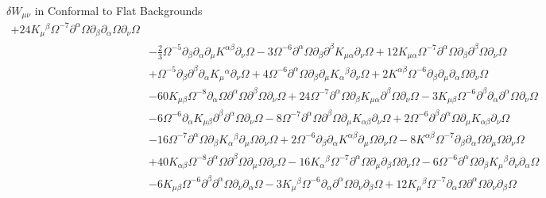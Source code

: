 \documentclass[8pt,aspectratio=1610]{beamer}
\begin{document}
\begin{frame}{$\delta W_{\mu\nu}$ in Conformal to Flat Backgrounds}
{\begin{align}
		+ 24 K_{\mu}{}^{\beta} \Omega^{-7} \partial^{\alpha}\Omega \partial_{\beta}\partial_{\alpha}\Omega \partial_{\nu}\Omega 
		\nonumber\\
		&-  \tfrac{2}{3} \Omega^{-5} \partial_{\beta}\partial_{\alpha}\partial_{\mu}K^{\alpha \beta} \partial_{\nu}\Omega - 3 \Omega^{-6} \partial^{\alpha}\Omega \partial_{\beta}\partial^{\beta}K_{\mu \alpha} \partial_{\nu}\Omega + 12 K_{\mu \alpha} \Omega^{-7} \partial^{\alpha}\Omega \partial_{\beta}\partial^{\beta}\Omega \partial_{\nu}\Omega 
		\nonumber\\
		&+ \Omega^{-5} \partial_{\beta}\partial^{\beta}\partial_{\alpha}K_{\mu}{}^{\alpha} \partial_{\nu}\Omega + 4 \Omega^{-6} \partial^{\alpha}\Omega \partial_{\beta}\partial_{\mu}K_{\alpha}{}^{\beta} \partial_{\nu}\Omega + 2 K^{\alpha \beta} \Omega^{-6} \partial_{\beta}\partial_{\mu}\partial_{\alpha}\Omega \partial_{\nu}\Omega 
		\nonumber\\
		&- 60 K_{\mu \beta} \Omega^{-8} \partial_{\alpha}\Omega \partial^{\alpha}\Omega \partial^{\beta}\Omega \partial_{\nu}\Omega + 24 \Omega^{-7} \partial^{\alpha}\Omega \partial_{\beta}K_{\mu \alpha} \partial^{\beta}\Omega \partial_{\nu}\Omega - 3 K_{\mu \beta} \Omega^{-6} \partial^{\beta}\partial_{\alpha}\partial^{\alpha}\Omega \partial_{\nu}\Omega 
		\nonumber\\
		&- 6 \Omega^{-6} \partial_{\alpha}K_{\mu \beta} \partial^{\beta}\partial^{\alpha}\Omega \partial_{\nu}\Omega - 8 \Omega^{-7} \partial^{\alpha}\Omega \partial^{\beta}\Omega \partial_{\mu}K_{\alpha \beta} \partial_{\nu}\Omega + 2 \Omega^{-6} \partial^{\beta}\partial^{\alpha}\Omega \partial_{\mu}K_{\alpha \beta} \partial_{\nu}\Omega 
		\nonumber\\
		&- 16 \Omega^{-7} \partial^{\alpha}\Omega \partial_{\beta}K_{\alpha}{}^{\beta} \partial_{\mu}\Omega \partial_{\nu}\Omega + 2 \Omega^{-6} \partial_{\beta}\partial_{\alpha}K^{\alpha \beta} \partial_{\mu}\Omega \partial_{\nu}\Omega - 8 K^{\alpha \beta} \Omega^{-7} \partial_{\beta}\partial_{\alpha}\Omega \partial_{\mu}\Omega \partial_{\nu}\Omega 
		\nonumber\\
		&+ 40 K_{\alpha \beta} \Omega^{-8} \partial^{\alpha}\Omega \partial^{\beta}\Omega \partial_{\mu}\Omega \partial_{\nu}\Omega - 16 K_{\alpha}{}^{\beta} \Omega^{-7} \partial^{\alpha}\Omega \partial_{\mu}\partial_{\beta}\Omega \partial_{\nu}\Omega - 6 \Omega^{-6} \partial^{\alpha}\Omega \partial_{\beta}K_{\mu}{}^{\beta} \partial_{\nu}\partial_{\alpha}\Omega 
		\nonumber\\
		&- 6 K_{\mu \beta} \Omega^{-6} \partial^{\beta}\partial^{\alpha}\Omega \partial_{\nu}\partial_{\alpha}\Omega - 3 K_{\mu}{}^{\beta} \Omega^{-6} \partial_{\alpha}\partial^{\alpha}\Omega \partial_{\nu}\partial_{\beta}\Omega + 12 K_{\mu}{}^{\beta} \Omega^{-7} \partial_{\alpha}\Omega \partial^{\alpha}\Omega \partial_{\nu}\partial_{\beta}\Omega 

\end{align}}
\end{frame}
\end{document}
